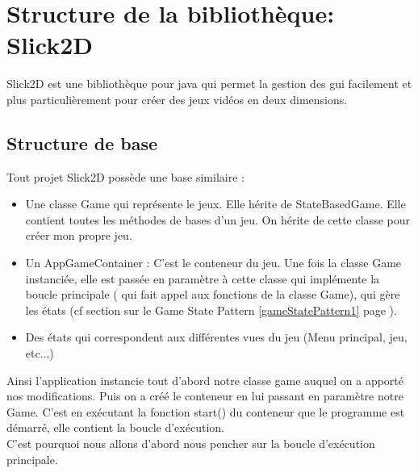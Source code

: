 \documentclass{report}
\begin{document}
\chapter{Structure de la bibliothèque: Slick2D}\label{slick2dd}
Slick2D est une bibliothèque pour java qui permet la gestion des gui facilement et plus particulièrement pour créer des jeux vidéos en deux dimensions.
\section{Structure de base}
Tout projet Slick2D possède une base similaire :
\begin{itemize}
\item Une classe Game qui représente le jeux. Elle hérite de StateBasedGame.
Elle contient toutes les méthodes de bases d'un jeu. On hérite de cette
classe pour créer mon propre jeu.
\item Un AppGameContainer : C'est le conteneur du jeu. Une fois la classe Game instanciée, elle est passée en paramètre à cette classe qui implémente la boucle principale ( qui fait appel aux fonctions de la classe Game), qui gère les états (cf section sur le Game State Pattern \ref{gameStatePattern1} page \pageref{gameStatePattern1}).
\item Des états qui correspondent aux différentes vues du jeu (Menu principal, jeu, etc...)
\end{itemize}
Ainsi l'application instancie tout d'abord notre classe game auquel on a apporté nos modifications. Puis on a créé le conteneur en lui passant en paramètre notre Game. C'est en exécutant la fonction start() du conteneur que le programme est démarré, elle contient la boucle d'exécution.\\
C'est pourquoi nous allons d'abord nous pencher sur la boucle d'exécution principale.
\end{document}
